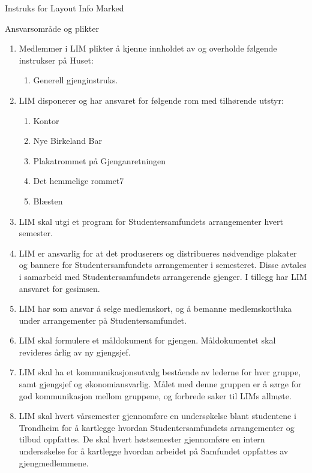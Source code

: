 \begin{instruks*}{Instruks for Layout Info Marked}
    \begin{instruksledd}{Ansvarsområde og plikter}
        \begin{enumerate}   
            \item  Medlemmer i LIM plikter å kjenne innholdet av og overholde følgende instrukser på
                Huset:
                \begin{enumerate}
                    \item Generell gjenginstruks.
                \end{enumerate}
            \item LIM disponerer og har ansvaret for følgende rom med tilhørende utstyr:
                \begin{enumerate}
                    \item Kontor
                    \item Nye Birkeland Bar
                    \item Plakatrommet på Gjenganretningen
                    \item Det hemmelige rommet7
                    \item Blæsten
                \end{enumerate}
            \item LIM skal utgi et program for
                Studentersamfundets arrangementer hvert semester.
            \item LIM er ansvarlig for at det
                produserers og distribueres nødvendige plakater og bannere for
                Studentersamfundets
                arrangementer i semesteret. Disse avtales i samarbeid med Studentersamfundets
                arrangerende
                gjenger. I tillegg har LIM ansvaret for gesimsen.
            \item LIM har som ansvar å selge medlemskort, og å
                bemanne medlemskortluka under arrangementer på Studentersamfundet.
            \item LIM skal formulere et måldokument for
                gjengen. Måldokumentet skal revideres årlig av ny gjengsjef.
            \item LIM skal ha et kommunikasjonsutvalg
                bestående av lederne for hver gruppe, samt gjengsjef og
                økonomiansvarlig. Målet med denne gruppen er å sørge for god kommunikasjon mellom gruppene, og
                forbrede saker til LIMs allmøte.
            \item LIM skal hvert vårsemester gjennomføre en
                undersøkelse blant studentene i Trondheim for å kartlegge
                hvordan Studentersamfundets arrangementer og tilbud oppfattes. De skal hvert høstsemester
                gjennomføre en
                intern undersøkelse for å kartlegge hvordan arbeidet på Samfundet oppfattes av gjengmedlemmene.
        \end{enumerate}
    \end{instruksledd}


\end{instruks*}
